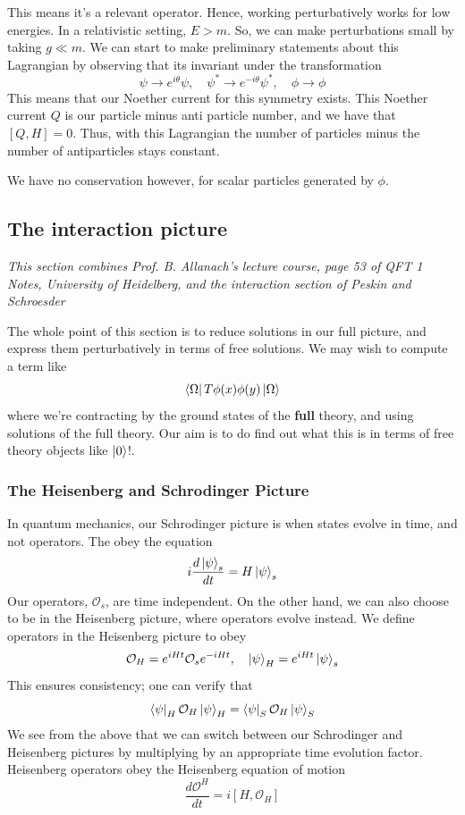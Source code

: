 \documentclass[11pt, oneside]{article}   	%
\theoremstyle{newline}
\theoremstyle{newline}
\theoremstyle{newline}
\theoremstyle{newline}
\theoremstyle{newline}
\begin{document}
This means it's a relevant operator. Hence, working perturbatively works 
for low energies. In a relativistic setting, 
$ E > m$. So, we can make perturbations small by taking 
$ g \ll m $. 
We can start to make preliminary statements about this Lagrangian by 
observing that  its invariant under the transformation 
\[
\psi \to e^{ i \theta } \psi, \quad \psi^ * \to e^{ - i \theta }\psi^ *  , \quad \phi \to \phi 
\] This means that our Noether current 
for this symmetry exists. This Noether current $ Q $ is our
particle minus anti particle number, and we have that $ [ Q, H ] = 0 $. 
Thus, with this Lagrangian the number of particles minus the number of antiparticles
stays constant. 

We have no conservation however, for scalar particles generated by  $ \phi$. 

\pagebreak 

\subsection{The interaction picture} 
\textit{This section combines Prof. B. Allanach's lecture course, 
page 53 of QFT 1 Notes, University of Heidelberg, and the interaction section 
of Peskin and Schroesder}


The whole point of this section is to reduce 
solutions in our full picture, and
express them perturbatively in terms of free solutions. 
We may wish to compute a term like 
\[
\bra{ \Omega } T \phi ( x) \phi ( y ) \ket{ \Omega } 
\] where we're contracting by the ground states of the 
\textbf{full} theory, and using solutions of the full theory. Our aim is to do find out what this is in terms of free theory objects like $ \ket{ 0 } $!. 

\subsubsection{The Heisenberg and Schrodinger Picture} 
In quantum mechanics, our Schrodinger picture is when states evolve in time, and not operators. 
The obey the equation 
\[
i \frac{ d \ket{ \psi }_ s }{ d t} = H \ket{ \psi } _ s  
\] Our operators, $ \mathcal{ O } _s $, are time independent. 
On the other hand, we can also choose to be in the Heisenberg picture, 
where operators evolve instead. We define operators in the 
Heisenberg picture to obey 
\[
\mathcal{ O }_ H = e^{ i H t } \mathcal{ O  }_ s e^{  - i H t}, \quad  \ket{ \psi } _ H = e^{ i H t } \ket{ \psi }_ s  \] This ensures consistency; one can verify that 
\[
\bra{ \psi }_H \mathcal{ O } _ H \ket{ \psi } _ H =    \bra{ \psi }_S \mathcal{ O } _ H \ket{ \psi } _ S   
\] We see from the above that we can switch between our Schrodinger and Heisenberg pictures by multiplying by an appropriate time evolution factor. Heisenberg operators obey the Heisenberg equation of motion
\[
\frac{ d \mathcal{ O}^H  }{dt } = i [ H, \mathcal{ O }_H ] 
\] 
\end{document}
